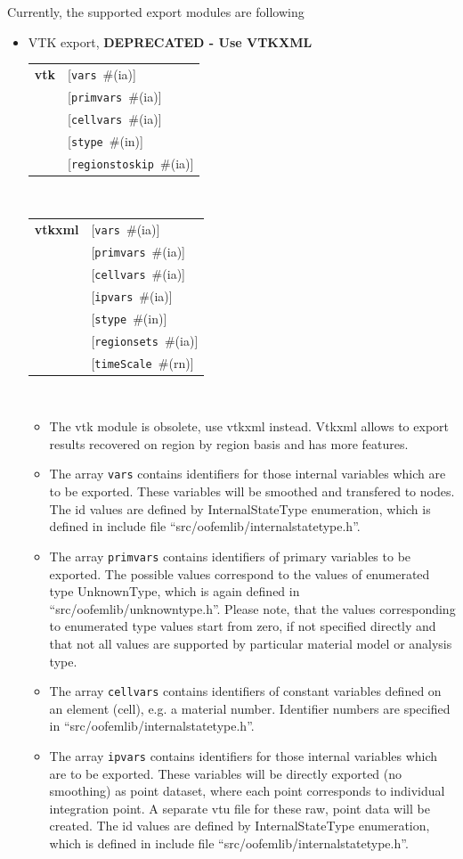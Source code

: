 \documentclass[a4paper]{article}
\makeatletter
\newcommand{\param}[1]{\texttt{#1}} %
\newcommand{\optional}[1]{[#1]} %
\newcommand{\field}[2]{\param{#1}~\#{\tiny(#2)}} %
\newcommand{\optField}[2]{\optional{\field{#1}{#2}}}
\newcommand{\entKeywordInst}[1]{\textbf{#1}} %
\newenvironment{record}[1][]{\begin{tabular}{|ll}}{\end{tabular}\\}
\newcommand{\recentry}[2]{{#1}&{#2}\\}
\newcounter{rcc}
\newenvironment{record}[1][\textwidth]{\setcounter{rcc}{0}\begin{tabular*}{#1}{|ll@{\extracolsep{\fill}}r}}{\end{tabular*}\\}
\newcommand{\recentry}[2]{\ifthenelse{\value{rcc}>0}{&$\backslash$ \\}{\setcounter{rcc}{1}}{#1}&{#2}}
\makeatother
\begin{document}
Currently, the supported export modules are following
\begin{itemize}
\item VTK export, \textbf{DEPRECATED - Use VTKXML}

\begin{record}[0.9\textwidth]
  \recentry{\entKeywordInst{vtk}}{\optField{vars}{ia}}
  \recentry{}{\optField{primvars}{ia}}
  \recentry{}{\optField{cellvars}{ia}}
  \recentry{}{\optField{stype}{in}}
  \recentry{}{\optField{regionstoskip}{ia}}
\end{record}


\begin{record}[0.9\textwidth]
  \recentry{\entKeywordInst{vtkxml}}{\optField{vars}{ia}}
  \recentry{}{\optField{primvars}{ia}}
  \recentry{}{\optField{cellvars}{ia}}
  \recentry{}{\optField{ipvars}{ia}}
  \recentry{}{\optField{stype}{in}}
  \recentry{}{\optField{regionsets}{ia}}
  \recentry{}{\optField{timeScale}{rn}}
\end{record}

\begin{itemize}
\item The vtk module is obsolete, use vtkxml instead. Vtkxml allows to export results recovered on region by region basis and has more features.

\item The array \param{vars} contains identifiers for those internal
variables which are to be exported. These variables will be smoothed and transfered to nodes. The id values are defined by
InternalStateType enumeration, which is defined in include file
``src/oofemlib/internal\-statetype.h''.

\item The array \param{primvars}
contains identifiers of primary variables to be exported.
The possible values correspond to the values of enumerated type
UnknownType, which is again defined in ``src/oofemlib/unknown\-type.h''.
Please note, that the values corresponding to enumerated type values
start from zero, if not specified directly and that not all values are
supported by particular material model or analysis type.

\item The array \param{cellvars} contains identifiers of constant variables defined
on an element (cell), e.g. a material number. Identifier numbers are specified in
``src/oofemlib/internalstatetype.h''.

\item The array \param{ipvars} contains identifiers for those internal
variables which are to be exported. These variables will be directly exported (no smoothing) as point dataset, where each point corresponds to individual integration point. A separate vtu file for these raw, point data will be created. 
The id values are defined by
InternalStateType enumeration, which is defined in include file
``src/oofemlib/internal\-statetype.h''.



\end{itemize}
\end{itemize}
\end{document}
